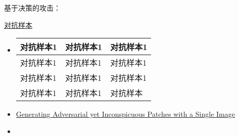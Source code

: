 \documentclass[
]{article}
\author{}
\date{}
\begin{document}
基于决策的攻击：

\href{https://arxiv.org/pdf/2010.08211}{对抗样本}

\begin{itemize}
\item
  \begin{longtable}[]{@{}lll@{}}
  \toprule
  对抗样本1 & 对抗样本1 & 对抗样本1\tabularnewline
  \midrule
  \endhead
  对抗样本1 & 对抗样本1 & 对抗样本1\tabularnewline
  对抗样本1 & 对抗样本1 & 对抗样本1\tabularnewline
  对抗样本1 & 对抗样本1 & 对抗样本\tabularnewline
  \bottomrule
  \end{longtable}
\item
  \href{https://arxiv.org/pdf/2010.07093}{Generating Adversarial yet
  Inconspicuous Patches with a Single Image}
\item
\end{itemize}
\end{document}
